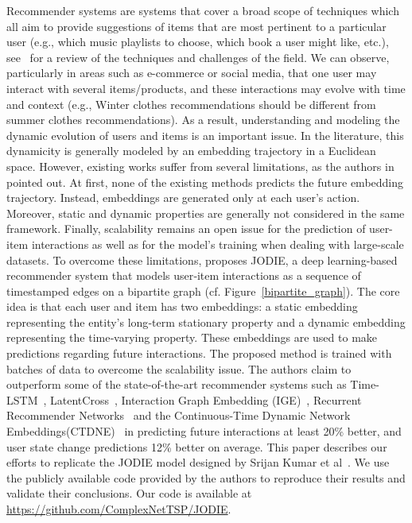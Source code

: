Recommender systems are systems that cover a broad scope of techniques which all aim to provide suggestions of items that are most pertinent to a particular user (e.g., which music playlists to choose, which book a user might like, etc.), see~\cite{Ricci_Rokach_Shapira_2021} for a review of the techniques and challenges of the field. We can observe, particularly in areas such as  e-commerce or social media, that one user may interact with several items/products, and these interactions may evolve with time and context (e.g., Winter clothes recommendations should be different from summer clothes recommendations). 
As a result,  understanding and modeling the dynamic evolution of users and items is an important issue. In the literature, this dynamicity is generally modeled by an embedding trajectory in a Euclidean space. However, existing works suffer from several limitations, as the authors in \cite{kumar2019predicting} pointed out. At first, none of the existing methods predicts the future embedding trajectory. Instead, embeddings are generated only at each user's action. Moreover, static and dynamic properties are generally not considered in the same framework. Finally, scalability remains an open issue for the prediction of user-item interactions as well as for the model's training when dealing with large-scale datasets. To overcome these limitations, \cite{kumar2019predicting} proposes JODIE, a deep learning-based recommender system that models user‐item interactions as a sequence of timestamped edges on a bipartite graph (cf. Figure~\ref{bipartite_graph}).
The core idea is that each user and item has two embeddings: a static embedding representing the entity's long‐term stationary property
and a dynamic embedding representing the time‐varying property. These embeddings are used to make predictions regarding future interactions. The proposed method is trained with batches of data to overcome the scalability issue.
The authors claim to outperform some of the state-of-the-art recommender systems such as Time-LSTM~\cite{Zhu17}, LatentCross~\cite{Beutel18}, Interaction Graph Embedding (IGE)~\cite{Zhang17}, Recurrent Recommender Networks~\cite{Wu17} and the Continuous-Time Dynamic Network Embeddings(CTDNE)~\cite{Nguyen18} in predicting future interactions  at least 20\% better, and user state change predictions 12\% better on average.
This paper describes our efforts to replicate the JODIE model designed by Srijan Kumar et al~\cite{kumar2019predicting}. 
We use the publicly available code provided by the authors to reproduce
their results and validate their conclusions. Our code is available at \url{https://github.com/ComplexNetTSP/JODIE}.


